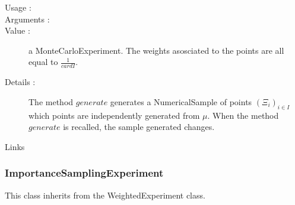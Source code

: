 \begin{description}

\item[Usage :] \rule{0pt}{1em}

\item[Arguments :]  \rule{0pt}{1em}

\item[Value :] a MonteCarloExperiment. The weights asosciated to the points are all equal to $\displaystyle \frac{1}{cardI}$.

\item[Details :]  The method $generate$ generates a NumericalSample of points  $(\Xi_i)_{i \in I}$  which points are independently generated from $\mu$. When the method $generate$ is recalled, the sample generated changes.

\item[Links] \rule{0pt}{1em}
\end{description}


\newpage         \subsubsection{ImportanceSamplingExperiment}

This class inherits from the WeightedExperiment class.\\

